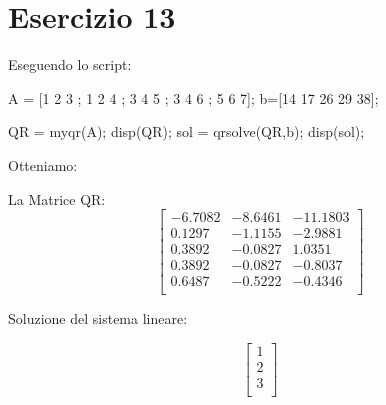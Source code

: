 \section{Esercizio 13}
Eseguendo lo script:


A = [1 2 3 ; 1 2 4 ; 3 4 5 ; 3 4 6 ; 5 6 7];
b=[14 17 26 29 38];

QR = myqr(A);
disp(QR);
sol = qrsolve(QR,b);
disp(sol);

Otteniamo: 

La Matrice QR:
\[\begin{bmatrix}
-6.7082 & -8.6461  & -11.1803\\
0.1297 & -1.1155 & -2.9881\\
0.3892 & -0.0827 & 1.0351\\
 0.3892 & -0.0827  & -0.8037\\
0.6487 & -0.5222  & -0.4346\\

\end{bmatrix}\]

Soluzione del sistema lineare: 

\[\begin{bmatrix}
1\\ 2\\3\\

\end{bmatrix}\]